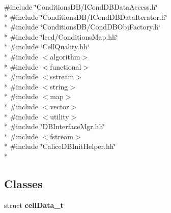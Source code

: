 {\ttfamily \#include \char`\"{}Conditions\-D\-B/\-I\-Cond\-D\-B\-Data\-Access.\-h\char`\"{}}\\*
{\ttfamily \#include \char`\"{}Conditions\-D\-B/\-I\-Cond\-D\-B\-Data\-Iterator.\-h\char`\"{}}\\*
{\ttfamily \#include \char`\"{}Conditions\-D\-B/\-Cond\-D\-B\-Obj\-Factory.\-h\char`\"{}}\\*
{\ttfamily \#include \char`\"{}lccd/\-Conditions\-Map.\-hh\char`\"{}}\\*
{\ttfamily \#include \char`\"{}Cell\-Quality.\-hh\char`\"{}}\\*
{\ttfamily \#include $<$algorithm$>$}\\*
{\ttfamily \#include $<$functional$>$}\\*
{\ttfamily \#include $<$sstream$>$}\\*
{\ttfamily \#include $<$string$>$}\\*
{\ttfamily \#include $<$map$>$}\\*
{\ttfamily \#include $<$vector$>$}\\*
{\ttfamily \#include $<$utility$>$}\\*
{\ttfamily \#include \char`\"{}D\-B\-Interface\-Mgr.\-hh\char`\"{}}\\*
{\ttfamily \#include $<$fstream$>$}\\*
{\ttfamily \#include \char`\"{}Calice\-D\-B\-Init\-Helper.\-hh\char`\"{}}\\*
\subsection*{Classes}
\begin{DoxyCompactItemize}
\item 
struct {\bf cell\-Data\-\_\-t}
\end{DoxyCompactItemize}

